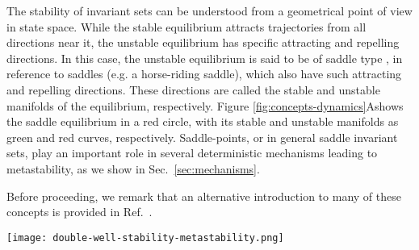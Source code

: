 The stability of invariant sets can be understood from a geometrical point of view in state space. While the stable equilibrium attracts trajectories from all directions near it, the unstable equilibrium has specific attracting and repelling directions. In this case, the unstable equilibrium is said to be of saddle type \cite{ott2002chaos}, in reference to saddles (e.g. a horse-riding saddle), which also have such attracting and repelling directions. These directions are called the stable and unstable manifolds of the equilibrium, respectively. Figure \ref{fig:concepts-dynamics}A\supprime shows the saddle equilibrium in a red circle, with its stable and unstable manifolds as green and red curves, respectively. Saddle-points, or in general saddle invariant sets, play an important role in several deterministic mechanisms leading to metastability, as we show in Sec.~\ref{sec:mechanisms}.

Before proceeding, we remark that an alternative introduction to many of these concepts is provided in Ref.~\cite{khona2022attractor}.
%
\begin{figure*}[htb]
    \centering
    \texttt{[image: double-well-stability-metastability.png]}
    \caption{\textbf{Illustration of multistability versus metastability}. Panels A and A\supprime illustrate the behavior of a ball on a double-well landscape, representing a multistable system. The stable and unstable equilibria are represented by green and red circles, respectively. In A, the ball is shown on the landscape to converge to the equilibrium on the right, where it stays indefinitely (equilibria are invariant). In A\supprime, a possible corresponding trajectory is shown in state space. The green curves leaving the unstable equilibrium denote its stable manifold, while the red curves denote the unstable manifold. In B, we suppose there is a demon kicking the ball and thus introducing white noise to its dynamics. This now makes the ball switch eternally between the two wells, and effectively transforms the previous equilibria (not invariant anymore, represented as faded circles) into metastable regions (which are almost-invariant), represented illustratively in B\supprime by the purple and green ellipses. }
    \label{fig:concepts-dynamics}
\end{figure*}



